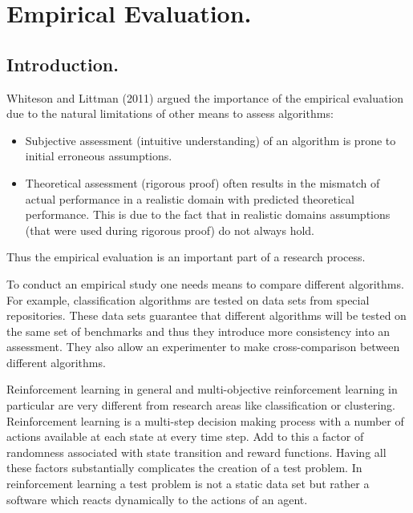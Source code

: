 \chapter{Empirical Evaluation.}

\section{Introduction.}

Whiteson and Littman (2011)\nocite{whiteson2011introduction} argued the importance of the empirical evaluation due to the natural limitations of other means to assess algorithms:

\begin{itemize}
  \item Subjective assessment (intuitive understanding) of an algorithm is prone to initial erroneous assumptions. 
  \item Theoretical assessment (rigorous proof) often results in the mismatch of actual performance in a realistic domain with predicted theoretical performance. This is due to the fact that in realistic domains assumptions (that were used during rigorous proof) do not always hold.
\end{itemize}
Thus the empirical evaluation is an important part of a research process.

To conduct an empirical study one needs means to compare different algorithms. For example, classification algorithms are tested on data sets from special repositories. These data sets guarantee that different algorithms will be tested on the same set of benchmarks and thus they introduce more consistency into an assessment. They also allow an experimenter to make cross-comparison between different algorithms.

Reinforcement learning in general and multi-objective reinforcement learning in particular are very different from research areas like classification or clustering. Reinforcement learning is a multi-step decision making process with a number of actions available at each state at every time step. Add to this a factor of randomness associated with state transition and reward functions. Having all these factors substantially complicates the creation of a test problem. In reinforcement learning a test problem is not a static data set but rather a software which reacts dynamically to the actions of an agent.

